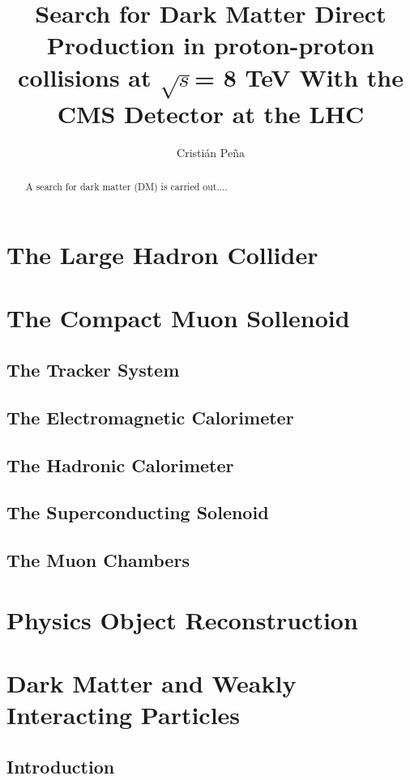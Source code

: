\documentclass[draftfoot,preprint]{cit_thesis}
\begin{document}
\title{Search for Dark Matter Direct Production in proton-proton collisions at $\sqrt{s} $= 8 TeV With the CMS Detector at the LHC}
\author{Cristi\'an Pe\~na}

\maketitle

\begin{abstract}
A search for dark matter (DM) is carried out....
\end{abstract}



\section{The Large Hadron Collider}
\section{The Compact Muon Sollenoid}
\subsection{The Tracker System}
\subsection{The Electromagnetic Calorimeter}
\subsection{The Hadronic Calorimeter}
\subsection{The Superconducting Solenoid}
\subsection{The Muon Chambers}
\section{Physics Object Reconstruction}
\section{Dark Matter and Weakly Interacting Particles}
\subsection{Introduction}
\end{document}
